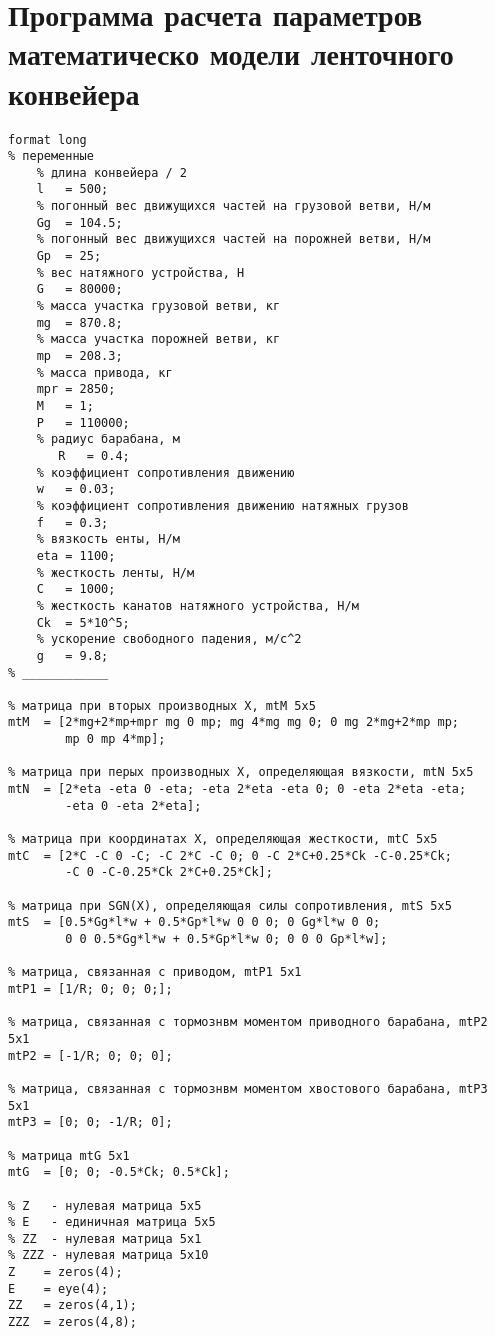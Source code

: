 \appendix
\setcounter{MaxMatrixCols}{20}
\chapter{Программа расчета параметров математическо модели ленточного конвейера} \label{Appendix0}
\begin{verbatim}
format long
% переменные
    % длина конвейера / 2
    l   = 500;
    % погонный вес движущихся частей на грузовой ветви, Н/м
    Gg  = 104.5;
    % погонный вес движущихся частей на порожней ветви, Н/м
    Gp  = 25;
    % вес натяжного устройства, Н
    G   = 80000;
    % масса участка грузовой ветви, кг
    mg  = 870.8;
    % масса участка порожней ветви, кг
    mp  = 208.3;
    % масса привода, кг
    mpr = 2850;
    M   = 1;
    P   = 110000;
    % радиус барабана, м
       R   = 0.4;
    % коэффициент сопротивления движению
    w   = 0.03;
    % коэффициент сопротивления движению натяжных грузов
    f   = 0.3;
    % вязкость енты, Н/м
    eta = 1100;
    % жесткость ленты, Н/м
    C   = 1000;
    % жесткость канатов натяжного устройства, Н/м
    Ck  = 5*10^5;
    % ускорение свободного падения, м/с^2
    g   = 9.8;
% ____________

% матрица при вторых производных X, mtM 5x5
mtM  = [2*mg+2*mp+mpr mg 0 mp; mg 4*mg mg 0; 0 mg 2*mg+2*mp mp;
        mp 0 mp 4*mp];

% матрица при перых производных X, определяющая вязкости, mtN 5x5
mtN  = [2*eta -eta 0 -eta; -eta 2*eta -eta 0; 0 -eta 2*eta -eta;
        -eta 0 -eta 2*eta];

% матрица при координатах X, определяющая жесткости, mtС 5x5
mtC  = [2*C -C 0 -C; -C 2*C -C 0; 0 -C 2*C+0.25*Ck -C-0.25*Ck;
        -C 0 -C-0.25*Ck 2*C+0.25*Ck];

% матрица при SGN(X), определяющая силы сопротивления, mtS 5x5
mtS  = [0.5*Gg*l*w + 0.5*Gp*l*w 0 0 0; 0 Gg*l*w 0 0;
        0 0 0.5*Gg*l*w + 0.5*Gp*l*w 0; 0 0 0 Gp*l*w];

% матрица, связанная с приводом, mtP1 5x1
mtP1 = [1/R; 0; 0; 0;];

% матрица, связанная с тормознвм моментом приводного барабана, mtP2 5x1
mtP2 = [-1/R; 0; 0; 0];

% матрица, связанная с тормознвм моментом хвостового барабана, mtP3 5x1
mtP3 = [0; 0; -1/R; 0];

% матрица mtG 5x1
mtG  = [0; 0; -0.5*Ck; 0.5*Ck];

% Z   - нулевая матрица 5x5
% E   - единичная матрица 5x5
% ZZ  - нулевая матрица 5x1
% ZZZ - нулевая матрица 5x10
Z    = zeros(4);
E    = eye(4);
ZZ   = zeros(4,1);
ZZZ  = zeros(4,8);


\end{verbatim}
